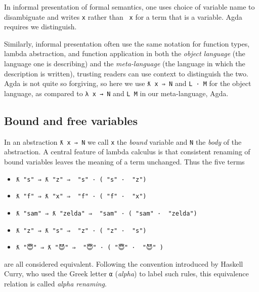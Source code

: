 In informal presentation of formal semantics, one uses choice of
variable name to disambiguate and writes \texttt{x} rather than
\texttt{\textasciigrave{}\ x} for a term that is a variable. Agda
requires we distinguish.

Similarly, informal presentation often use the same notation for
function types, lambda abstraction, and function application in both the
\emph{object language} (the language one is describing) and the
\emph{meta-language} (the language in which the description is written),
trusting readers can use context to distinguish the two. Agda is not
quite so forgiving, so here we use \texttt{ƛ\ x\ ⇒\ N} and
\texttt{L\ ·\ M} for the object language, as compared to
\texttt{λ\ x\ →\ N} and \texttt{L\ M} in our meta-language, Agda.

\hypertarget{bound-and-free-variables}{%
\subsection{Bound and free variables}\label{bound-and-free-variables}}

In an abstraction \texttt{ƛ\ x\ ⇒\ N} we call \texttt{x} the
\emph{bound} variable and \texttt{N} the \emph{body} of the abstraction.
A central feature of lambda calculus is that consistent renaming of
bound variables leaves the meaning of a term unchanged. Thus the five
terms

\begin{itemize}
\tightlist
\item
  \texttt{ƛ\ "s"\ ⇒\ ƛ\ "z"\ ⇒\ \textasciigrave{}\ "s"\ ·\ (\textasciigrave{}\ "s"\ ·\ \textasciigrave{}\ "z")}
\item
  \texttt{ƛ\ "f"\ ⇒\ ƛ\ "x"\ ⇒\ \textasciigrave{}\ "f"\ ·\ (\textasciigrave{}\ "f"\ ·\ \textasciigrave{}\ "x")}
\item
  \texttt{ƛ\ "sam"\ ⇒\ ƛ\ "zelda"\ ⇒\ \textasciigrave{}\ "sam"\ ·\ (\textasciigrave{}\ "sam"\ ·\ \textasciigrave{}\ "zelda")}
\item
  \texttt{ƛ\ "z"\ ⇒\ ƛ\ "s"\ ⇒\ \textasciigrave{}\ "z"\ ·\ (\textasciigrave{}\ "z"\ ·\ \textasciigrave{}\ "s")}
\item
  \texttt{ƛ\ "😇"\ ⇒\ ƛ\ "😈"\ ⇒\ \textasciigrave{}\ "😇"\ ·\ (\textasciigrave{}\ "😇"\ ·\ \textasciigrave{}\ "😈"\ )}
\end{itemize}

are all considered equivalent. Following the convention introduced by
Haskell Curry, who used the Greek letter \texttt{α} (\emph{alpha}) to
label such rules, this equivalence relation is called \emph{alpha
renaming}.

